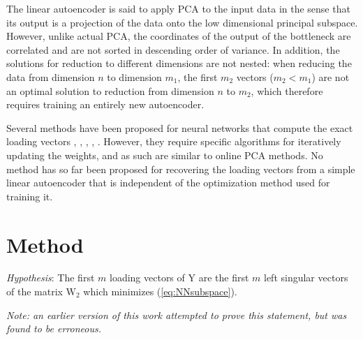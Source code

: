 The linear autoencoder is said to apply PCA to the input data in the sense that its output is a projection of the data onto the low dimensional principal subspace. However, unlike actual PCA, the coordinates of the output of the bottleneck are correlated and are not sorted in descending order of variance. In addition, the solutions for reduction to different dimensions are not nested: when reducing the data from dimension $n$ to dimension $m_1$, the first $m_2$ vectors ($m_2 < m_1$) are not an optimal solution to reduction from dimension $n$ to $m_2$, which therefore requires training an entirely new autoencoder.

Several methods have been proposed for neural networks that compute the exact loading vectors \cite{NNPCA1}, \cite{NNPCA2}, \cite{NNPCA3}, \cite{NNPCA4}, \cite{NNPCA5}. However, they require specific algorithms for iteratively updating the weights, and as such are similar to online PCA methods. No method has so far been proposed for recovering the loading vectors from a simple linear autoencoder that is independent of the optimization method used for training it.

\section{Method}

\emph{Hypothesis}: The first $m$ loading vectors of $\text{Y}$ are the first $m$ left singular vectors of the matrix $\text{W}_2$ which minimizes (\ref{eq:NNsubspace}).

\emph{Note: an earlier version of this work attempted to prove this statement, but was found to be erroneous.}

